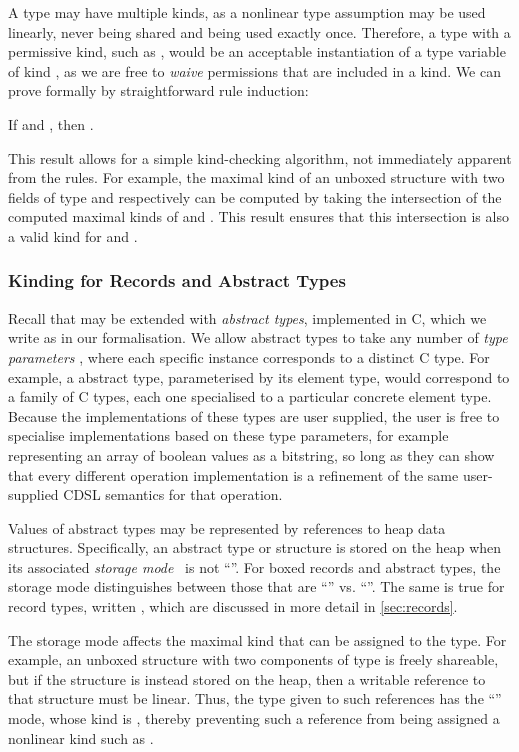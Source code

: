 \documentclass[9pt\ifFinal\else,preprint,nocopyrightspace\fi,\ifAlpha\else natbib,authoryear\fi]{sigplanconf}
\begin{document}
A type may have multiple kinds, as a nonlinear type assumption may be used linearly, never being shared and being used exactly once. Therefore, a type with a
permissive kind, such as , would be an acceptable instantiation of a type variable of kind , as we are free to 
\emph{waive} permissions that are included in a kind. We can prove formally by straightforward rule induction:
\begin{lemma} If  and , then .
\end{lemma}
\noindent This result allows for a simple kind-checking algorithm, not immediately apparent from the rules. For example, the maximal kind of an unboxed
structure with two fields of type  and  respectively can be computed by taking the intersection of the computed maximal kinds of  and . This result ensures
that this intersection is also a valid kind for  and .

\subsubsection{Kinding for Records and Abstract Types}\label{s:kindrec}

Recall that \CDSL may be extended with \emph{abstract types}, implemented in
C, which we write as
 in our formalisation. We allow abstract types
to take any number of \emph{type parameters} , where each specific
instance corresponds to a distinct C type. For example, a  abstract type,
parameterised by its element type, would correspond to a family of C  types,
each one specialised to a particular concrete element type. Because the implementations of these
types are user supplied, the user is free to specialise implementations based on these type parameters,
for example representing an array of boolean values as a bitstring, so long as they can show 
that every different operation implementation is a refinement of the same user-supplied CDSL 
semantics for that operation.

Values of abstract types may be represented by references to heap data structures. 
Specifically, an abstract type or structure is stored on the heap when its associated
\emph{storage mode}~ is not ``\Unboxed''. For boxed records and abstract
types, the storage mode distinguishes between those that are ``\Writable'' vs.
``\ReadOnly''. The same is true for record types, written ,
which are discussed in more detail in \autoref{sec:records}.


The storage mode  affects the maximal kind that can be assigned
to the type. For example, an unboxed structure with two components of type  is freely shareable, but if the structure is
instead stored on the heap, then a writable reference to that structure must be linear. Thus, the type given to such references has the ``'' mode,
whose kind is , thereby preventing such a reference from being assigned a nonlinear kind such as .
\end{document}
